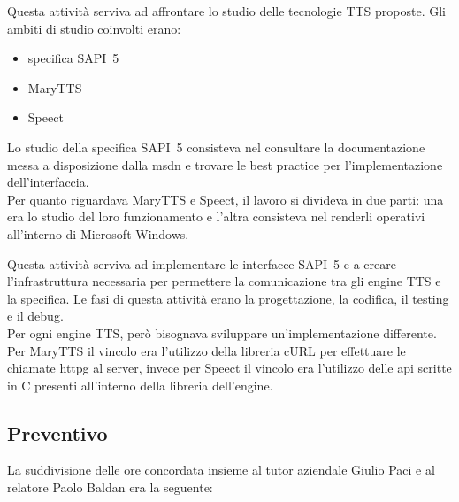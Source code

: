 \begin{description}[style=unboxed]
	\item[Studio delle tecnologie TTS] Questa attività serviva ad affrontare lo studio delle tecnologie TTS proposte. Gli ambiti di studio coinvolti erano:
	\begin{itemize}
		\item specifica SAPI~5
		\item MaryTTS
		\item Speect
	\end{itemize}
	Lo studio della specifica SAPI~5 consisteva nel consultare la documentazione messa a disposizione dalla \gls{msdn} e trovare le best practice per l'implementazione dell'interfaccia.\\
	Per quanto riguardava MaryTTS e Speect, il lavoro si divideva in due parti: una era lo studio del loro funzionamento e l'altra consisteva nel renderli operativi all'interno di Microsoft Windows.\\
	
	\item[Implementazione delle interfacce SAPI~5 per gli engine MaryTTS e Speect]
	Questa attività serviva ad implementare le interfacce SAPI~5 e a creare l'infrastruttura necessaria per permettere la comunicazione tra gli engine TTS e la specifica. Le fasi di questa attività erano la progettazione, la codifica, il testing e il debug.\\
	Per ogni engine TTS, però bisognava sviluppare un'implementazione differente. Per MaryTTS il vincolo era l'utilizzo della libreria cURL per effettuare le chiamate \gls{httpg} al server, invece per Speect il vincolo era l'utilizzo delle \gls{api} scritte in C presenti all'interno della libreria dell'engine.
	  
\end{description}

\subsection{Preventivo}

La suddivisione delle ore concordata insieme al tutor aziendale Giulio Paci e al relatore Paolo Baldan era la seguente:

